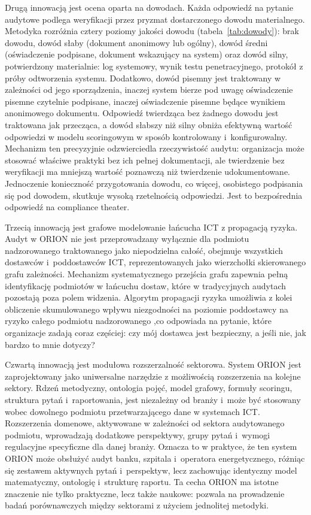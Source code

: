 Drugą innowacją jest ocena oparta na dowodach. Każda odpowiedź na pytanie audytowe podlega weryfikacji przez pryzmat dostarczonego dowodu materialnego. Metodyka rozróżnia cztery poziomy jakości dowodu (tabela~\ref{tab:dowody}): brak dowodu, dowód słaby (dokument anonimowy lub ogólny), dowód średni (oświadczenie podpisane, dokument wskazujący na system) oraz dowód silny, potwierdzony materialnie: log systemowy, wynik testu penetracyjnego, protokół z próby odtworzenia systemu.  Dodatkowo, dowód pisemny jest traktowany w zależności od jego sporządzenia, inaczej system bierze pod uwagę oświadczenie pisemne czytelnie podpisane, inaczej oświadczenie pisemne będące wynikiem anonimowego dokumentu. Odpowiedź twierdząca bez żadnego dowodu jest traktowana jak przecząca, a dowód słabszy niż silny obniża efektywną wartość odpowiedzi w modelu scoringowym w sposób kontrolowany i~konfigurowalny. Mechanizm ten precyzyjnie odzwierciedla rzeczywistość audytu: organizacja może  stosować właściwe praktyki bez ich pełnej dokumentacji, ale twierdzenie bez weryfikacji ma mniejszą wartość poznawczą niż twierdzenie udokumentowane. Jednoczenie konieczność przygotowania dowodu, co więcej, osobistego podpisania się pod dowodem, skutkuje wysoką rzetelnością odpowiedzi. Jest to bezpośrednia odpowiedź na compliance theater.

Trzecią innowacją jest grafowe modelowanie łańcucha ICT z propagacją ryzyka. Audyt w ORION nie jest przeprowadzany wyłącznie dla podmiotu nadzorowanego traktowanego jako niepodzielna całość, obejmuje wszystkich dostawców i~poddostawców ICT, reprezentowanych jako wierzchołki skierowanego grafu zależności. Mechanizm systematycznego przejścia grafu zapewnia pełną identyfikację podmiotów w łańcuchu dostaw, które w tradycyjnych audytach pozostają poza polem widzenia. Algorytm propagacji ryzyka umożliwia z kolei obliczenie skumulowanego wpływu niezgodności na poziomie poddostawcy na ryzyko całego podmiotu nadzorowanego ,co odpowiada na pytanie, które organizacje zadają coraz częściej: czy mój dostawca jest bezpieczny, a jeśli nie, jak bardzo to mnie dotyczy?

Czwartą innowacją jest modułowa rozszerzalność sektorowa. System ORION jest zaprojektowany jako uniwersalne narzędzie z możliwością rozszerzenia na kolejne sektory. Rdzeń metodyczny, ontologia pojęć, model grafowy, formuły scoringu, struktura pytań i~raportowania, jest niezależny od branży i~może być stosowany wobec dowolnego podmiotu przetwarzającego dane w systemach ICT. Rozszerzenia domenowe, aktywowane w zależności od sektora audytowanego podmiotu, wprowadzają dodatkowe perspektywy, grupy pytań i~wymogi regulacyjne specyficzne dla danej branży. Oznacza to w praktyce, że ten system ORION może obsłużyć audyt banku, szpitala i~operatora energetycznego, różniąc się zestawem aktywnych pytań i~perspektyw, lecz zachowując identyczny model matematyczny, ontologię i~strukturę raportu. Ta cecha ORION ma istotne znaczenie nie tylko praktyczne, lecz także naukowe: pozwala na prowadzenie badań porównawczych między sektorami z użyciem jednolitej metodyki.



